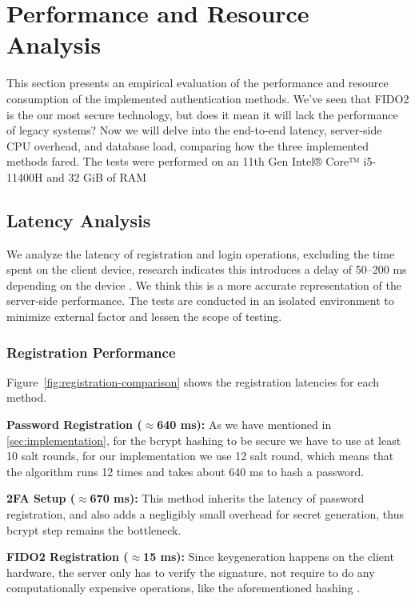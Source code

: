 \section{Performance and Resource Analysis}\label{sec:performance-resource}

This section presents an empirical evaluation of the performance and resource consumption of the implemented authentication methods. We've seen that FIDO2 is the our most secure technology, but does it mean it will lack the performance of legacy systems?  Now we will delve into the end-to-end latency, server-side CPU overhead, and database load, comparing how the three implemented methods fared.
The tests were performed on an 11th Gen Intel® Core™ i5-11400H and 32 GiB of RAM
\subsection{Latency Analysis}

We analyze the latency of registration and login operations, excluding the time spent on the client device, research indicates this introduces a delay of 50--200 ms depending on the device \cite{wuersching2023platformvsroaming}. We think this is a more accurate representation of the server-side performance. The tests are conducted in an isolated environment to minimize external factor and lessen the scope of testing.

\subsubsection{Registration Performance}
Figure~\ref{fig:registration-comparison} shows the registration latencies for each method.

\textbf{Password Registration ($\approx$640 ms):} As we have mentioned in \ref{sec:implementation}, for the bcrypt hashing to be secure we have to use at least 10 salt rounds, for our implementation we use 12 salt round, which means that the algorithm runs 12 times and takes about 640 ms to hash a password.

\textbf{2FA Setup ($\approx$670 ms):} This method inherits the latency of password registration, and also adds a negligibly small overhead for secret generation, thus bcrypt step remains the bottleneck.

\textbf{FIDO2 Registration ($\approx$15 ms):} Since keygeneration happens on the client hardware, the server only has to verify the signature, not require to do any computationally expensive operations, like the aforementioned hashing \cite{lyastani2020kingslayer}.

